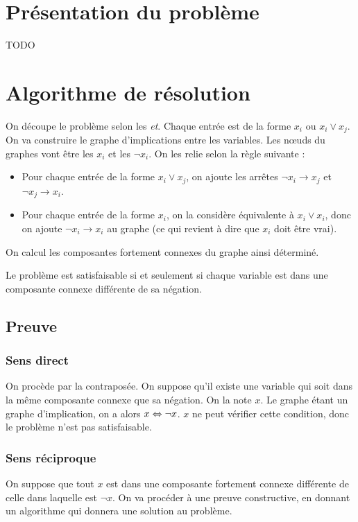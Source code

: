 \section{Présentation du problème}
TODO

\section{Algorithme de résolution}
On découpe le problème selon les \emph{et}. Chaque entrée est de la forme $x_i$
ou $x_i \vee x_j$. On va construire le graphe d'implications entre les
variables. Les nœuds du graphes vont être les $x_i$ et les $\neg x_i$. On les
relie selon la règle suivante : \begin{itemize}
 \item Pour chaque entrée de la forme $x_i \vee x_j$, on ajoute les arrêtes
       $\neg x_i \rightarrow x_j$ et $\neg x_j \rightarrow x_i$.
 \item Pour chaque entrée de la forme $x_i$, on la considère équivalente à
       $x_i \vee x_i$, donc on ajoute $\neg x_i \rightarrow x_i$ au graphe (ce
       qui revient à dire que $x_i$ doit être vrai).
\end{itemize}

On calcul les composantes fortement connexes du graphe ainsi déterminé.

Le problème est satisfaisable si et seulement si chaque variable est dans une
composante connexe différente de sa négation.

\subsection{Preuve}
\subsubsection{Sens direct}
On procède par la contraposée. On suppose qu'il existe une variable qui soit
dans la même composante connexe que sa négation. On la note $x$. Le graphe
étant un graphe d'implication, on a alors $x \Leftrightarrow \neg x$. $x$ ne peut
vérifier cette condition, donc le problème n'est pas satisfaisable.

\subsubsection{Sens réciproque}
On suppose que tout $x$ est dans une composante fortement connexe différente de
celle dans laquelle est $\neg x$. On va procéder à une preuve constructive, en
donnant un algorithme qui donnera une solution au problème.

